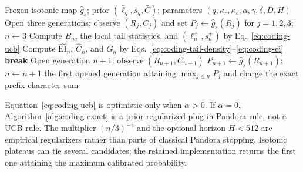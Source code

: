 \begin{algorithm}[t]
\caption{Coding: shifted-exponential Pandora in correctness-probability space}
\label{alg:coding-exact}
\begin{algorithmic}[1]
\Require Frozen isotonic map $\widehat g_s$; prior
$(\bar\ell_q,\bar s_q,\bar C)$; parameters
$(q,\kappa_r,\kappa_c,\alpha,\gamma,\delta,D,H)$
\State Open three generations; observe $(R_j,C_j)$ and set
       $P_j\gets\widehat g_s(R_j)$ for $j=1,2,3$; $n\gets3$
  \State Compute $B_n$, the local tail statistics, and
         $(\ell_n^+,s_n^+)$ by Eq.~\eqref{eq:coding-ucb}
  \State Compute $\widehat{\mathrm{EI}}_n$, $\widehat C_n$, and $G_n$ by
         Eqs.~\eqref{eq:coding-tail-density}--\eqref{eq:coding-ei}
    \State \textbf{break}
  \EndIf
  \State Open generation $n+1$; observe $(R_{n+1},C_{n+1})$
  \State $P_{n+1}\gets\widehat g_s(R_{n+1})$; $n\gets n+1$
\EndWhile
\State \Return the first opened generation attaining $\max_{j\le n}P_j$ and
       charge the exact prefix character sum
\end{algorithmic}
\end{algorithm}

Equation~\eqref{eq:coding-ucb} is optimistic only when $\alpha>0$.  If
$\alpha=0$, Algorithm~\ref{alg:coding-exact} is a prior-regularized plug-in
Pandora rule, not a UCB rule.  The multiplier $(n/3)^{-\gamma}$ and the optional
horizon $H<512$ are empirical regularizers rather than parts of classical
Pandora stopping.  Isotonic plateaus can tie several candidates; the retained
implementation returns the first one attaining the maximum calibrated
probability.

